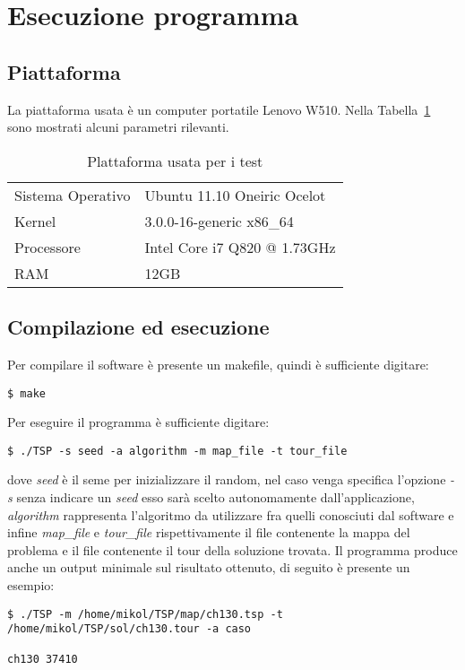 \chapter*{Esecuzione programma}
\label{cha_esecuzione}

\section*{Piattaforma}
\label{sec_piattaforma}
La piattaforma usata è un computer portatile Lenovo W510. Nella Tabella~\ref{tab_statpc} sono mostrati alcuni parametri rilevanti.

\begin{table}[htb]
  \caption{Plattaforma usata per i test\label{tab_statpc}}
  \centering
\begin{tabular}{ll}
  \toprule
  Sistema Operativo		& Ubuntu 11.10 Oneiric Ocelot \\
  Kernel			& 3.0.0-16-generic x86\_64 \\
  Processore			& Intel Core i7 Q820 @ 1.73GHz \\
  RAM				& 12GB \\
  \bottomrule
\end{tabular}
\end{table}

\section*{Compilazione ed esecuzione}
\label{sec_comp_exec}
Per compilare il software è presente un makefile, quindi è sufficiente digitare:
\begin{lstlisting}
$ make
\end{lstlisting}
Per eseguire il programma è sufficiente digitare:
\begin{lstlisting}
$ ./TSP -s seed -a algorithm -m map_file -t tour_file
\end{lstlisting}
dove \emph{seed} è il seme per inizializzare il random, nel caso venga specifica l'opzione \emph{-s} senza indicare un \emph{seed} esso sarà scelto autonomamente dall'applicazione, \emph{algorithm} rappresenta l'algoritmo da utilizzare fra quelli conosciuti dal software e infine \emph{map\_file} e \emph{tour\_file} rispettivamente il file contenente la mappa del problema e il file contenente il tour della soluzione trovata. Il programma produce anche un output minimale sul risultato ottenuto, di seguito è presente un esempio:
\begin{lstlisting}[breaklines=true]
$ ./TSP -m /home/mikol/TSP/map/ch130.tsp -t /home/mikol/TSP/sol/ch130.tour -a caso

ch130 37410
\end{lstlisting}

